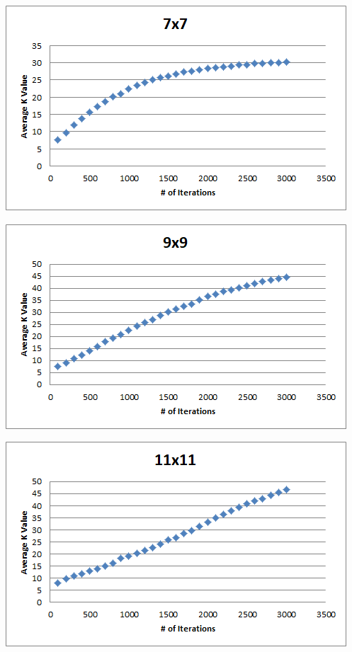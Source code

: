 \documentclass[12pt, letterpaper]{article}
\begin{document}
\includegraphics[width=\linewidth]{"Task 3/7x7 Scatterplot"}

\includegraphics[width=\linewidth]{"Task 3/9x9 Scatterplot"}

\includegraphics[width=\linewidth]{"Task 3/11x11 Scatterplot"}

\pagebreak
\end{document}
